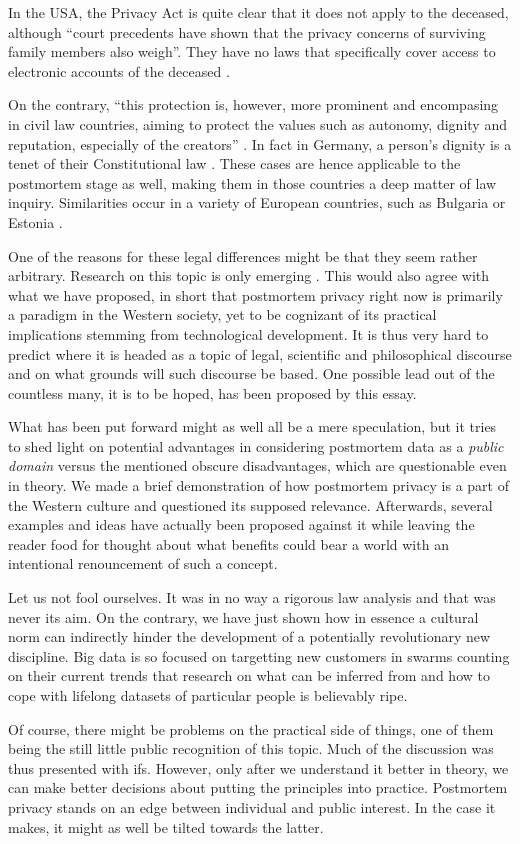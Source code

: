 In the USA, the Privacy Act is quite clear that it does not apply to the deceased, although ``court precedents have shown that the privacy concerns of surviving family members also weigh''. They have no laws that specifically cover access to electronic accounts of the deceased \cite{grabianowski}.

On the contrary, ``this protection is, however, more prominent and encompasing in civil law countries, aiming to protect the values such as autonomy, dignity and reputation, especially of the creators'' \cite{harbinja2}. In fact in Germany, a person's dignity is a tenet of their Constitutional law \cite{buitelaar}. These cases are hence applicable to the postmortem stage as well, making them in those countries a deep matter of law inquiry. Similarities occur in a variety of European countries, such as Bulgaria or Estonia \cite{harbinja}.

One of the reasons for these legal differences might be that they seem rather arbitrary. Research on this topic is only emerging \cite{harbinja2}. This would also agree with what we have proposed, in short that postmortem privacy right now is primarily a paradigm in the Western society, yet to be cognizant of its practical implications stemming from technological development.
It is thus very hard to predict where it is headed as a topic of legal, scientific and philosophical discourse and on what grounds will such discourse be based. One possible lead out of the countless many, it is to be hoped, has been proposed by this essay.

\medskip
What has been put forward might as well all be a mere speculation, but it tries to shed light on potential advantages in considering postmortem data as a \emph{public domain} versus the mentioned obscure disadvantages, which are questionable even in theory. We made a brief demonstration of how postmortem privacy is a part of the Western culture and questioned its supposed relevance. Afterwards, several examples and ideas have actually been proposed against it while leaving the reader food for thought about what benefits could bear a world with an intentional renouncement of such a concept.

Let us not fool ourselves. It was in no way a rigorous law analysis and that was never its aim. On the contrary, we have just shown how in essence a cultural norm can indirectly hinder the development of a potentially revolutionary new discipline.
Big data is so focused on targetting new customers in swarms counting on their current trends that research on what can be inferred from and how to cope with lifelong datasets of particular people is believably  ripe.

Of course, there might be problems on the practical side of things, one of them being the still little public recognition of this topic. Much of the discussion was thus presented with ifs. However, only after we understand it better in theory, we can make better decisions about putting the principles into practice. Postmortem privacy stands on an edge between individual and public interest. In the case it makes, it might as well be tilted towards the latter.


